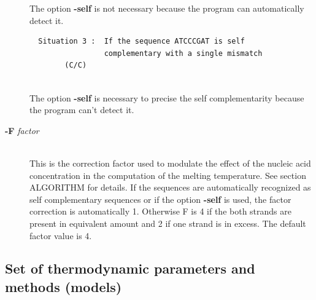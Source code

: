 \documentclass{article}
\begin{document}
\begin{description}
\begin{verbatim}
  \end{verbatim}
    
  The option \textbf{-self} is not necessary because the program 
  can automatically detect it.
  
  \begin{verbatim}  
  Situation 3 :  If the sequence ATCCCGAT is self 
                 complementary with a single mismatch 
		(C/C)
      
  \end{verbatim}
  		 
  The option \textbf{-self} is necessary to precise the self 
  complementarity because the program can't detect it.
      
 \item [\textbf{-F} \textit{factor}  ]\mbox{}\\
  This is the correction factor used to modulate the effect of the nucleic acid concentration in the computation of the melting temperature. 
  See section ALGORITHM for details. If the sequences are automatically recognized as self complementary sequences or if the option \textbf{-self}
  is used, the factor correction is automatically 1. Otherwise F is 4 if the both strands are present in equivalent amount and 2 if one strand is in excess. 
  The default factor value is 4.
\end{description}

\subsection{Set of thermodynamic parameters and methods (models)}
\end{document}
